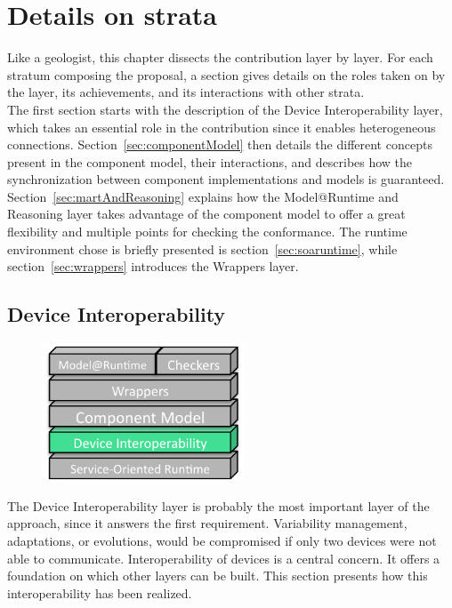 \chapter{Details on strata}
\label{ch:detailsStrata}


Like a geologist, this chapter dissects the contribution layer by layer. For each stratum composing the proposal, a section gives details on the roles taken on by the layer, its achievements, and its interactions with other strata.\\

The first section starts with the description of the Device Interoperability layer, which takes an essential role in the contribution since it enables heterogeneous connections. Section~\ref{sec:componentModel} then details the different concepts present in the component model, their interactions, and describes how the synchronization between component implementations and models is guaranteed. Section~\ref{sec:martAndReasoning} explains how the Model@Runtime and Reasoning layer takes advantage of the component model to offer a great flexibility and multiple points for checking the conformance. The runtime environment chose is briefly presented is section~\ref{sec:soaruntime}, while section~\ref{sec:wrappers} introduces the Wrappers layer.

\section{Device Interoperability}

\begin{figure}
  \vspace{-5mm}
  \includegraphics[width=60mm]{part2/pics/layers/DevicesInterop.pdf}
  \vspace{-5mm}
\end{figure}

The Device Interoperability layer is probably the most important layer of the approach, since it answers the first requirement. Variability management, adaptations, or evolutions, would be compromised if only two devices were not able to communicate. Interoperability of devices is a central concern. It offers a foundation on which other layers can be built. This section presents how this interoperability has been realized.\\

